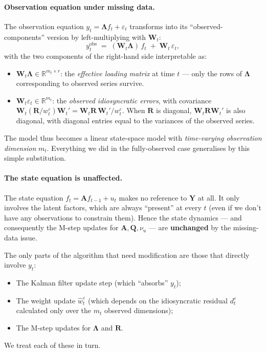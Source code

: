 \documentclass[11pt, a4paper, oneside]{article}
\newcommand{\mL}{\boldsymbol{\Lambda}}
\begin{document}
\paragraph{Observation equation under missing data.}
The observation equation $y_t = \mL f_t + \varepsilon_t$
transforms into its ``observed-components'' version by left-multiplying
with $\mathbf{W}_t$:
\begin{equation}
y_t^{\mathrm{obs}} \;=\; (\mathbf{W}_t \mL)\, f_t \;+\; \mathbf{W}_t\, \varepsilon_t,
\label{eq:obs-eq-missing}
\end{equation}
with the two components of the right-hand side interpretable as:
\begin{itemize}[leftmargin=1.5em, itemsep=2pt]
    \item $\mathbf{W}_t \mL \in \mathbb{R}^{m_t \times r}$: the
          \emph{effective loading matrix} at time $t$ — only the rows of
          $\mL$ corresponding to observed series survive.
    \item $\mathbf{W}_t \varepsilon_t \in \mathbb{R}^{m_t}$: the
          \emph{observed idiosyncratic errors}, with covariance
          $\mathbf{W}_t (\mathbf{R}/w^\varepsilon_t) \mathbf{W}_t' = \mathbf{W}_t \mathbf{R}\, \mathbf{W}_t' / w^\varepsilon_t$.
          When $\mathbf{R}$ is diagonal, $\mathbf{W}_t \mathbf{R} \mathbf{W}_t'$ is also
          diagonal, with diagonal entries equal to the variances of
          the observed series.
\end{itemize}
The model thus becomes a linear state-space model with \emph{time-varying
observation dimension} $m_t$. Everything we did in the fully-observed
case generalises by this simple substitution.

\paragraph{The state equation is unaffected.}
The state equation $f_t = \mathbf{A} f_{t-1} + u_t$ makes no reference to
$\mathbf{Y}$ at all. It only involves the latent factors, which are
always ``present'' at every $t$ (even if we don't have any observations
to constrain them). Hence the state dynamics — and consequently the
M-step updates for $\mathbf{A}, \mathbf{Q}, \nu_u$ — are \textbf{unchanged}
by the missing-data issue.

The only parts of the algorithm that need modification are those that
directly involve $y_t$:
\begin{itemize}[leftmargin=1.5em, itemsep=2pt]
    \item The Kalman filter update step (which ``absorbs'' $y_t$);
    \item The weight update $\hat{w}^\varepsilon_t$ (which depends on
          the idiosyncratic residual $d^\varepsilon_t$ calculated only over the $m_t$ observed dimensions);
    \item The M-step updates for $\mL$ and $\mathbf{R}$.
\end{itemize}
We treat each of these in turn.
\end{document}
